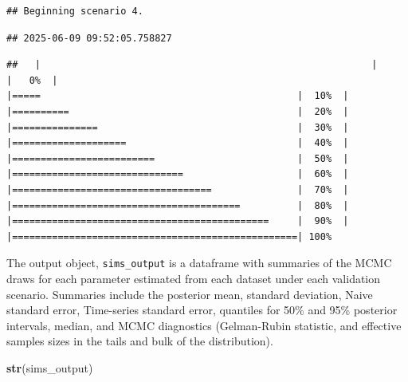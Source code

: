 \documentclass[
]{article}
\newenvironment{Shaded}{\begin{snugshade}}{\end{snugshade}}
\newcommand{\FunctionTok}[1]{\textcolor[rgb]{0.13,0.29,0.53}{\textbf{#1}}}
\newcommand{\NormalTok}[1]{#1}
\begin{document}
\begin{verbatim}
## Beginning scenario 4.
\end{verbatim}

\begin{verbatim}
## 2025-06-09 09:52:05.758827
\end{verbatim}

\begin{verbatim}
##   |                                                          |                                                  |   0%  |                                                          |=====                                             |  10%  |                                                          |==========                                        |  20%  |                                                          |===============                                   |  30%  |                                                          |====================                              |  40%  |                                                          |=========================                         |  50%  |                                                          |==============================                    |  60%  |                                                          |===================================               |  70%  |                                                          |========================================          |  80%  |                                                          |=============================================     |  90%  |                                                          |==================================================| 100%
\end{verbatim}

\linespread{1}

The output object, \texttt{sims\_output} is a dataframe with summaries of the MCMC draws for each parameter estimated from each dataset under each validation scenario. Summaries include the posterior mean, standard deviation, Naive standard error, Time-series standard error, quantiles for 50\% and 95\% posterior intervals, median, and MCMC diagnostics (Gelman-Rubin statistic, and effective samples sizes in the tails and bulk of the distribution).

\linespread{1}

\begin{Shaded}
\begin{Highlighting}[]
\FunctionTok{str}\NormalTok{(sims\_output)}
\end{Highlighting}
\end{Shaded}
\end{document}
